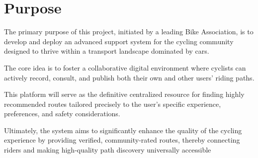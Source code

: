 \section{Purpose}
The primary purpose of this project, initiated by a leading Bike Association,
is to develop and deploy an advanced support system for the cycling community designed
to thrive within a transport landscape dominated by cars.

The core idea is to foster
a collaborative digital environment where cyclists can actively record, consult,
and publish both their own and other users' riding paths.

This platform will serve as the definitive centralized resource for finding highly recommended routes tailored
precisely to the user's specific experience, preferences, and safety considerations.

Ultimately, the system aims to significantly enhance the quality of the cycling experience
by providing verified, community-rated routes, thereby connecting riders and making
high-quality path discovery universally accessible

